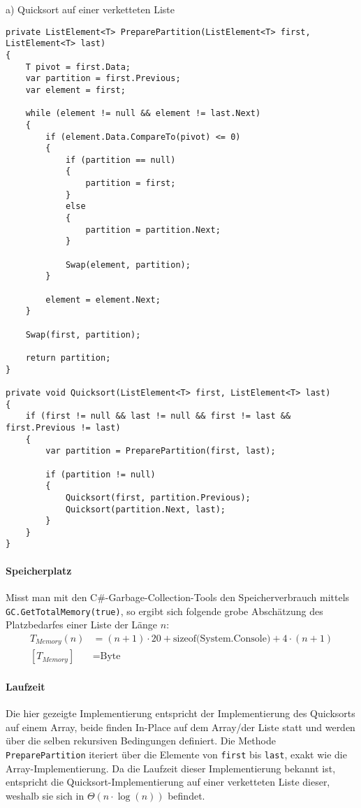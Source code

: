 a) Quicksort auf einer verketteten Liste \\
\begin{verbatim}
private ListElement<T> PreparePartition(ListElement<T> first, ListElement<T> last)
{
    T pivot = first.Data;
    var partition = first.Previous;
    var element = first;

    while (element != null && element != last.Next)
    {
        if (element.Data.CompareTo(pivot) <= 0)
        {
            if (partition == null)
            {
                partition = first;
            }
            else
            {
                partition = partition.Next;
            }

            Swap(element, partition);
        }

        element = element.Next;
    }

    Swap(first, partition);

    return partition;
}

private void Quicksort(ListElement<T> first, ListElement<T> last)
{
    if (first != null && last != null && first != last && first.Previous != last)
    {
        var partition = PreparePartition(first, last);

        if (partition != null)
        {
            Quicksort(first, partition.Previous);
            Quicksort(partition.Next, last);
        }
    }
}
\end{verbatim}

\vspace{0.5cm}

\paragraph{Speicherplatz} Misst man mit den C\#-Garbage-Collection-Tools den Speicherverbrauch mittels \texttt{GC.GetTotalMemory(true)}, so ergibt sich folgende grobe Abschätzung des Platzbedarfes einer Liste der Länge $n$:
\begin{align*}
    T_{Memory}(n) &= (n + 1)\cdot 20 + \text{sizeof(System.Console)} + 4 \cdot (n + 1) \\
    [T_{Memory}] &= \text{Byte}
\end{align*}

\paragraph{Laufzeit} Die hier gezeigte Implementierung entspricht der Implementierung des Quicksorts auf einem Array, beide finden In-Place auf dem Array/der Liste statt und werden über die selben rekursiven Bedingungen definiert. Die Methode \texttt{PreparePartition} iteriert über die Elemente von \texttt{first} bis \texttt{last}, exakt wie die Array-Implementierung. Da die Laufzeit dieser Implementierung bekannt ist, entspricht die Quicksort-Implementierung auf einer verketteten Liste dieser, weshalb sie sich in $\Theta(n \cdot \log(n))$ befindet. \\